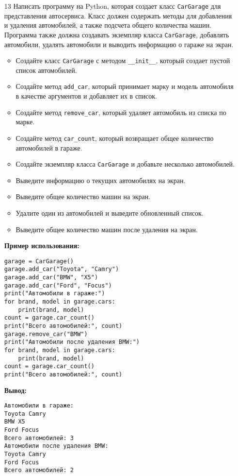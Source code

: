 \begin{enumerate}
\item[13] Написать программу на Python, которая создает класс \texttt{CarGarage} для представления автосервиса. Класс должен содержать методы для добавления и удаления автомобилей, а также подсчета общего количества машин. Программа также должна создавать экземпляр класса \texttt{CarGarage}, добавлять автомобили, удалять автомобили и выводить информацию о гараже на экран.

\begin{itemize}
    \item Создайте класс \texttt{CarGarage} с методом \texttt{\_\_init\_\_}, который создает пустой список автомобилей.
    \item Создайте метод \texttt{add\_car}, который принимает марку и модель автомобиля в качестве аргументов и добавляет их в список.
    \item Создайте метод \texttt{remove\_car}, который удаляет автомобиль из списка по марке.
    \item Создайте метод \texttt{car\_count}, который возвращает общее количество автомобилей в гараже.
    \item Создайте экземпляр класса \texttt{CarGarage} и добавьте несколько автомобилей.
    \item Выведите информацию о текущих автомобилях на экран.
    \item Выведите общее количество машин на экран.
    \item Удалите один из автомобилей и выведите обновленный список.
    \item Выведите общее количество машин после удаления на экран.
\end{itemize}

\textbf{Пример использования:}

\begin{verbatim}
garage = CarGarage()
garage.add_car("Toyota", "Camry")
garage.add_car("BMW", "X5")
garage.add_car("Ford", "Focus")
print("Автомобили в гараже:")
for brand, model in garage.cars:
    print(brand, model)
count = garage.car_count()
print("Всего автомобилей:", count)
garage.remove_car("BMW")
print("Автомобили после удаления BMW:")
for brand, model in garage.cars:
    print(brand, model)
count = garage.car_count()
print("Всего автомобилей:", count)
\end{verbatim}

\textbf{Вывод:}
\begin{verbatim}
Автомобили в гараже:
Toyota Camry
BMW X5
Ford Focus
Всего автомобилей: 3
Автомобили после удаления BMW:
Toyota Camry
Ford Focus
Всего автомобилей: 2
\end{verbatim}


\end{enumerate}

